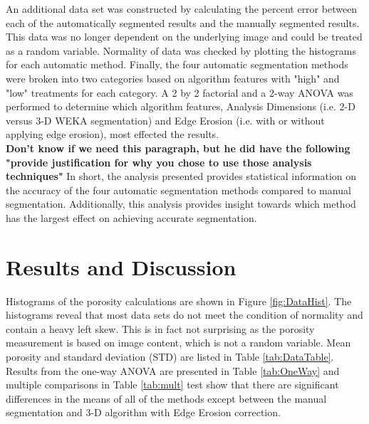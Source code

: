 \documentclass[11pt, twocolumn]{article}
\begin{document}
An additional data set was constructed by calculating the percent error between each of the automatically segmented results and the manually segmented results. This data was no longer dependent on the underlying image and could be treated as a random variable. Normality of data was checked by plotting the histograms for each automatic method. Finally, the four automatic segmentation methods  were broken into two categories based on algorithm features with "high" and "low" treatments for each category. A 2 by 2 factorial and a 2-way ANOVA was performed to determine which algorithm features, Analysis Dimensions (i.e. 2-D versus 3-D WEKA segmentation) and Edge Erosion (i.e. with or without applying edge erosion), most effected the results.\\
\textbf{Don't know if we need this paragraph, but he did have the following "provide justification for why you chose to use those analysis techniques"} In short, the analysis presented provides statistical information on the accuracy of the four automatic segmentation methods compared to manual segmentation. Additionally, this analysis provides insight towards which method has the largest effect on achieving accurate segmentation.

\section{Results and Discussion} \label{RandD}
Histograms of the porosity calculations are shown in Figure \ref{fig:DataHist}. The histograms reveal that most data sets do not meet the condition of normality and contain a heavy left skew. This is in fact not surprising as the porosity measurement is based on image content, which is not a random variable. Mean porosity and standard deviation (STD) are listed in Table \ref{tab:DataTable}. Results from the one-way ANOVA are presented in Table \ref{tab:OneWay} and multiple comparisons in Table \ref{tab:mult} test show that there are significant differences in the means of all of the methods except between the manual segmentation and 3-D algorithm with Edge Erosion correction. 
\end{document}
